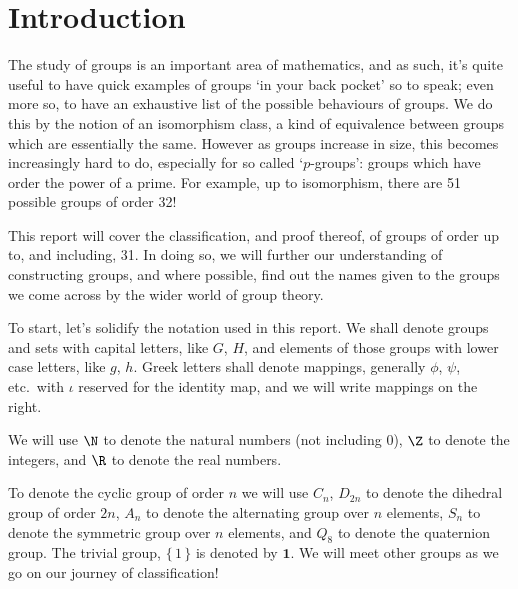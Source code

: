 \section{Introduction}
The study of groups is an important area of mathematics, and as such, it's quite useful to have quick examples of groups
`in your back pocket' so to speak; even more so, to have an exhaustive list of the possible behaviours of groups.
We do this by the notion of an isomorphism class, a kind of equivalence between groups which are essentially the same.
However as groups increase in size, this becomes increasingly hard to do, especially for so called `\(p\)-groups':
groups which have order the power of a prime.
For example, up to isomorphism, there are 51 possible groups of order 32!

This report will cover the classification, and proof thereof, of groups of order up to, and including, 31.
In doing so, we will further our understanding of constructing groups, and where possible, find out the names given to
the groups we come across by the wider world of group theory.

To start, let's solidify the notation used in this report.
We shall denote groups and sets with capital letters, like \(G\), \(H\), and elements of those groups with lower case
letters, like \(g\), \(h\).
Greek letters shall denote mappings, generally \(\phi\), \(\psi\), etc.\ with \(\iota\) reserved for the identity map,
and we will write mappings on the right.

We will use \(\N\) to denote the natural numbers (not including 0), \(\Z\) to denote the integers, and \(\R\) to denote
the real numbers.

To denote the cyclic group of order \(n\) we will use \(C_n\), \(D_{2n}\) to denote the dihedral group of order \(2n\),
\(A_n\) to denote the alternating group over \(n\) elements, \(S_n\) to denote the symmetric group over \(n\)
elements, and \(Q_8\) to denote the quaternion group.
The trivial group, \(\{\, 1\, \}\) is denoted by \(\bm{1}\).
We will meet other groups as we go on our journey of classification!

